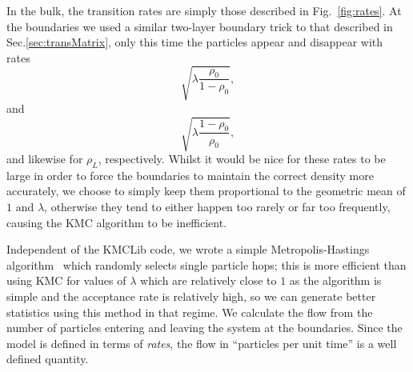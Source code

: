 \documentclass[
reprint, amsmath,amssymb, aps,
 pre, longbibliography,
]{revtex4-1}
\begin{document}
In the bulk, the transition rates are simply
those described in Fig.~\ref{fig:rates}. At the boundaries we used a similar two-layer boundary trick to that described in Sec.\ref{sec:transMatrix}, only this time the particles appear and disappear with rates
\begin{equation}
\sqrt{\lambda\frac{\rho_0}{1-\rho_0}},
\end{equation}
and
\begin{equation}
\sqrt{\lambda\frac{1-\rho_0}{\rho_0}},
\end{equation}
and likewise for $\rho_L$, respectively. Whilst it would be nice for these rates to be large in order to force the boundaries to maintain the correct density more accurately,
we choose to simply keep them proportional to the geometric mean of $1$ and $\lambda$,
otherwise they tend to either happen too rarely or far too frequently, causing the KMC algorithm to be inefficient.


Independent of the KMCLib code, we wrote a simple Metropolis-Hastings
algorithm~\cite{metHastAlg} which randomly selects single particle hops; this is more efficient than using KMC for values of
$\lambda$ which are relatively close to $1$ as the algorithm is simple and the acceptance rate is relatively high, so we can generate better statistics using this method in that regime.
We calculate the flow from the number of particles entering and
leaving the system at the boundaries.  Since the model is defined in
terms of {\it rates}, the flow in ``particles per unit time'' is a well
defined quantity.
\end{document}
